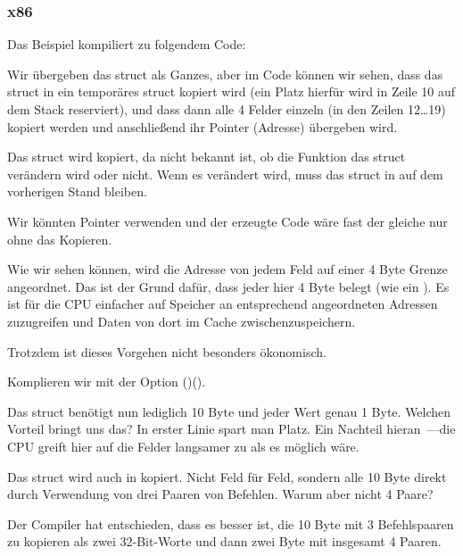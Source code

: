 \subsubsection{x86}

Das Beispiel kompiliert zu folgendem Code:


Wir übergeben das struct als Ganzes, aber im Code können wir sehen, dass das struct in ein temporäres struct kopiert
wird (ein Platz hierfür wird in Zeile 10 auf dem Stack reserviert), und dass dann alle 4 Felder einzeln (in den Zeilen
12\ldots 19) kopiert werden und anschließend ihr Pointer (Adresse) übergeben wird.

Das struct wird kopiert, da nicht bekannt ist, ob die Funktion \ttf{} das struct verändern wird oder nicht.
Wenn es verändert wird, muss das struct in \main auf dem vorherigen Stand bleiben.

Wir könnten \CCpp Pointer verwenden und der erzeugte Code wäre fast der gleiche nur ohne das Kopieren.

Wie wir sehen können, wird die Adresse von jedem Feld auf einer 4 Byte Grenze angeordnet. Das ist der Grund dafür, dass
jeder \Tchar hier 4 Byte belegt (wie ein \Tint). Es ist für die CPU einfacher auf Speicher an entsprechend angeordneten
Adressen zuzugreifen und Daten von dort im Cache zwischenzuspeichern.

Trotzdem ist dieses Vorgehen nicht besonders ökonomisch.

Komplieren wir mit der Option ()().


Das struct benötigt nun lediglich 10 Byte und jeder \Tchar Wert genau 1 Byte. Welchen Vorteil bringt uns das? 
In erster Linie spart man Platz. Ein Nachteil hieran~---die CPU greift hier auf die Felder langsamer zu als es möglich
wäre.

\label{short_struct_copying_using_MOV}
Das struct wird auch in \main kopiert. Nicht Feld für Feld, sondern alle 10 Byte direkt durch Verwendung von drei Paaren
von \MOV Befehlen. Warum aber nicht 4 Paare?

Der Compiler hat entschieden, dass es besser ist, die 10 Byte mit 3 \MOV Befehlspaaren zu kopieren als zwei 32-Bit-Worte
und dann zwei Byte mit insgesamt 4 \MOV Paaren.


